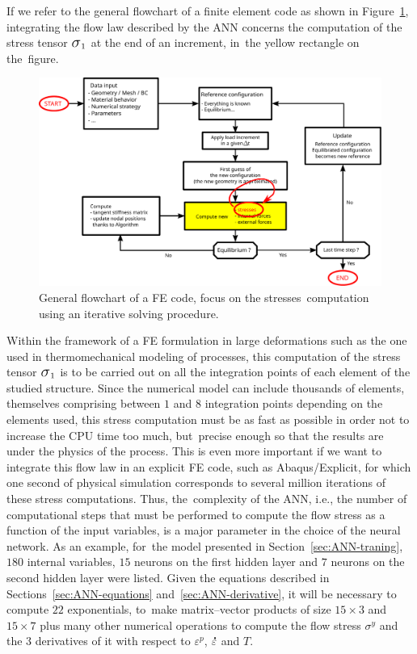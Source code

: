 \documentclass[algorithms,article,accept,pdftex,moreauthors]{Definitions/mdpi}
\makeatletter
\DeclareRobustCommand{\Sig}{\mbox{\Large\ensuremath{\sigma}}}
\DeclareRobustCommand{\mdot}[1]{\accentset{\mbox{\bfseries .}}{#1}}
\DeclareRobustCommand{\ie}{{i.e.,}\@\xspace}
\makeatother
\begin{document}
If we refer to the general flowchart of a finite element code as shown in Figure~\ref{fig:StressUpdate}, integrating the flow law described by the ANN concerns the computation of the stress tensor $\Sig_1$ at the end of an increment, in~the yellow rectangle on the~figure.
\begin{figure}[H]
\includegraphics[width=0.9\columnwidth]{Figures/StressUpdate}
\caption{General flowchart of a FE code, focus on the stresses~computation using an iterative solving procedure.}
\label{fig:StressUpdate}
\end{figure}
Within the framework of a FE formulation in large deformations such as the one used in thermomechanical modeling of processes, this computation of the stress tensor $\Sig_1$ is to be carried out on all the integration points of each element of the studied structure.
Since the numerical model can include thousands of elements, themselves comprising between $1$ and $8$ integration points depending on the elements used, this stress computation must be as fast as possible in order not to increase the CPU time too much, but~precise enough so that the results are under the physics of the process.
This is even more important if we want to integrate this flow law in an explicit FE code, such as Abaqus/Explicit, for which one second of physical simulation corresponds to several million iterations of these stress computations.
Thus, the~complexity of the ANN, \ie the number of computational steps that must be performed to compute the flow stress as a function of the input variables, is a major parameter in the choice of the neural network.
As an example, for~the model presented in Section~\ref{sec:ANN-traning}, $180$ internal variables, $15$ neurons on the first hidden layer and $7$ neurons on the second hidden layer were listed.
Given the equations described in Sections~\ref{sec:ANN-equations} and~\ref{sec:ANN-derivative}, it will be necessary to compute $22$ exponentials, to~make matrix--vector products of size $15\times3$ and $15\times7$ plus many other numerical operations to compute the flow stress $\sigma^y$ and the $3$ derivatives of it with respect to $\varepsilon^p$, $\mdot\varepsilon$ and $T$.
\end{document}

